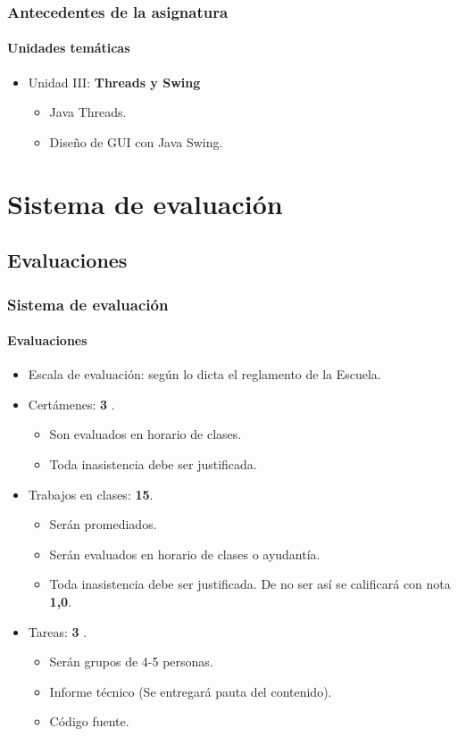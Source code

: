 \documentclass{beamer}
\begin{document}
		\begin{frame}
			\frametitle{Antecedentes de la asignatura}
			\framesubtitle{Unidades tem\'aticas}

			\begin{itemize}
				\item Unidad III: \textbf{Threads y Swing}
				\begin{itemize}
					\item Java Threads.
				  \item Dise\~no de GUI con Java Swing.
				\end{itemize}
			\end{itemize}
		\end{frame}

	\section{Sistema de evaluaci\'on}

		\subsection{Evaluaciones}

		\begin{frame}
			\frametitle{Sistema de evaluaci\'on}
			\framesubtitle{Evaluaciones}

			\begin{itemize}
				\item Escala de evaluaci\'on: seg\'un lo dicta el reglamento de la Escuela.
				\item Cert\'amenes: \textbf{3} .
				\begin{itemize}
					\item Son evaluados en horario de clases.
					\item Toda inasistencia debe ser justificada.
				\end{itemize}
				\item Trabajos en clases: \textbf{15}.
				\begin{itemize}
					\item Ser\'an promediados.
					\item Ser\'an evaluados en horario de clases o ayudant\'ia.
					\item Toda inasistencia debe ser justificada. De no ser as\'i se calificar\'a con nota \textbf{1,0}.
				\end{itemize}
				\item Tareas: \textbf{3} .
				\begin{itemize}
				   \item Ser\'an grupos de 4-5 personas.
					\item Informe t\'ecnico (Se entregar\'a pauta del contenido).
					\item C\'odigo fuente.
				\end{itemize}
			\end{itemize}
		\end{frame}
\end{document}
